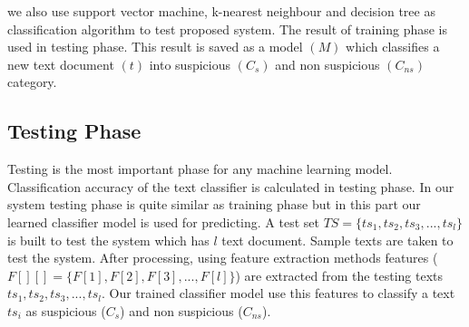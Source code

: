 we also use support vector machine, k-nearest neighbour and decision tree as classification algorithm to test proposed system. The result of training phase is used in testing phase. This result is saved as a model $(M)$ which classifies a new text document $(t)$ into suspicious $(C_s)$ and non suspicious $(C_{ns})$ category. 
\subsection{\textbf{Testing Phase}}
Testing is the most important phase for any machine learning model. Classification accuracy of the text classifier is calculated in testing phase. In our system testing phase is quite similar as training phase but in this part our learned classifier model is used for predicting. A test set $TS =\{ts_1, ts_2, ts_3, ..., ts_l\}$ is built to test the system which has $l$ text document. Sample texts are taken to test the system. After processing, using feature extraction methods features ($F[][]=\{F[1], F[2], F[3], ... ,F[l]\}$) are extracted from the testing texts $ts_1, ts_2, ts_3, ..., ts_l$. Our trained classifier model use this features to classify a text $ts_i$ as suspicious ($C_s$) and non suspicious ($C_{ns}$).